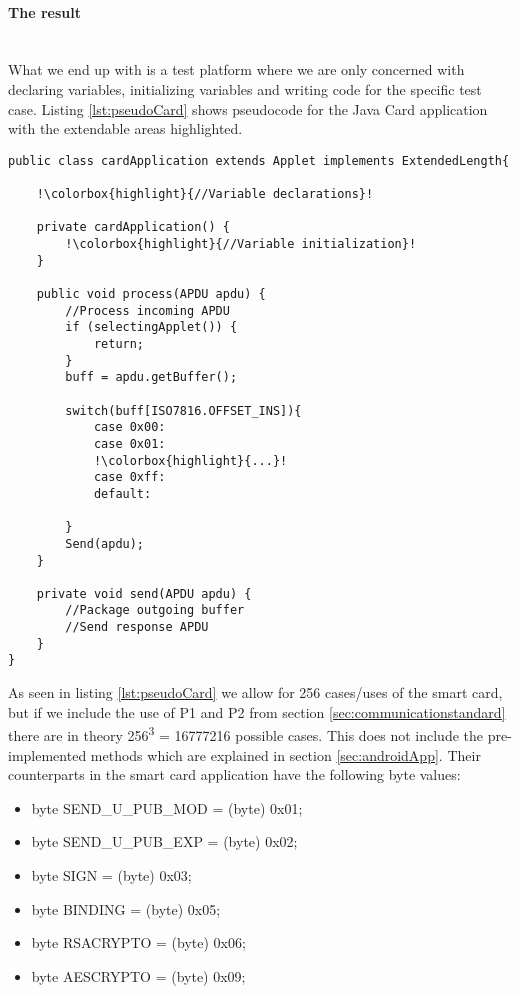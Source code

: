 \paragraph{The result}\mbox{}\\
What we end up with is a test platform where we are only concerned with declaring variables, initializing variables and writing code for the specific test case. Listing \ref{lst:pseudoCard} shows pseudocode for the Java Card application with the extendable areas highlighted.


\begin{lstlisting}[caption=Pseudo code for javacard test application., label=lst:pseudoCard,escapechar=!]
public class cardApplication extends Applet implements ExtendedLength{

    !\colorbox{highlight}{//Variable declarations}!

    private cardApplication() {
    	!\colorbox{highlight}{//Variable initialization}!
    }

    public void process(APDU apdu) {
    	//Process incoming APDU
        if (selectingApplet()) {
			return;
		}
        buff = apdu.getBuffer();

    	switch(buff[ISO7816.OFFSET_INS]){
            case 0x00:
            case 0x01:
            !\colorbox{highlight}{...}!
            case 0xff:
            default:

    	}
    	Send(apdu);
    }

    private void send(APDU apdu) {
    	//Package outgoing buffer
    	//Send response APDU
    }
}
\end{lstlisting}

As seen in listing \ref{lst:pseudoCard} we allow for 256 cases/uses of the smart card, but if we include the use of P1 and P2 from section \ref{sec:communicationstandard} there are in theory 256\textsuperscript{3} = 16777216 possible cases. This does not include the pre-implemented methods which are explained in section \ref{sec:androidApp}. Their counterparts in the smart card application have the following byte values:

\begin{itemize}
    \item byte SEND\_U\_PUB\_MOD = (byte) 0x01;
    \item byte SEND\_U\_PUB\_EXP = (byte) 0x02;
    \item byte SIGN = (byte) 0x03;
    \item byte BINDING = (byte) 0x05;
    \item byte RSACRYPTO = (byte) 0x06;
    \item byte AESCRYPTO = (byte) 0x09;
\end{itemize}

